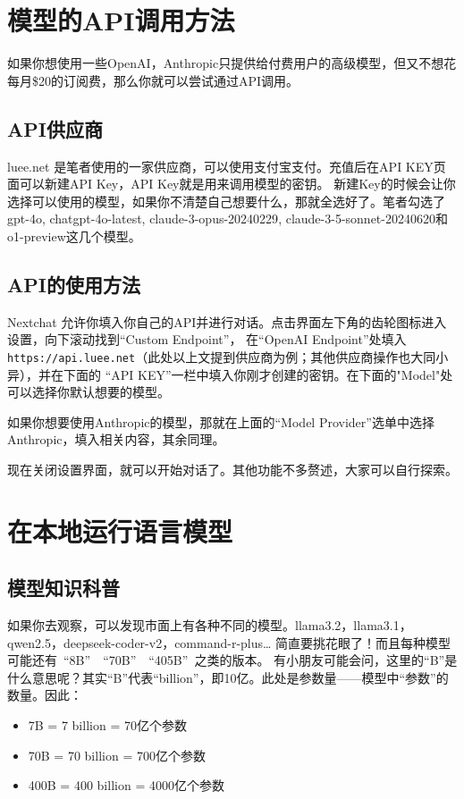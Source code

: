 \hypertarget{api}{\section{模型的API调用方法}}
如果你想使用一些\textsf{OpenAI}，\textsf{Anthropic}只提供给付费用户的高级模型，但又不想花每月\$20的订阅费，那么你就可以尝试通过API调用。

\subsection{API供应商}

\textsf{luee.net} \href{https://luee.net}{\color{black}\faLink} 是笔者使用的一家供应商，可以使用支付宝支付。充值后在API KEY页面可以新建API Key，API Key就是用来调用模型的密钥。
新建Key的时候会让你选择可以使用的模型，如果你不清楚自己想要什么，那就全选好了。笔者勾选了\textsf{gpt-4o}, \textsf{chatgpt-4o-latest}, 
\textsf{claude-3-opus-20240229}, \textsf{claude-3-5-sonnet-20240620}和\textsf{o1-preview}这几个模型。
\subsection{API的使用方法}
\textsf{Nextchat} \href{https://app.nextchat.dev}{\color{black}\faLink} 允许你填入你自己的API并进行对话。点击界面左下角的齿轮图标进入设置，向下滚动找到“Custom Endpoint”，
    在“OpenAI Endpoint”处填入\texttt{https://api.luee.net}（此处以上文提到供应商为例；其他供应商操作也大同小异），并在下面的 “API KEY”一栏中填入你刚才创建的密钥。在下面的"Model"处可以选择你默认想要的模型。

    如果你想要使用\textsf{Anthropic}的模型，那就在上面的“Model Provider”选单中选择\textsf{Anthropic}，填入相关内容，其余同理。

现在关闭设置界面，就可以开始对话了。其他功能不多赘述，大家可以自行探索。

\section{在本地运行语言模型}
\subsection{模型知识科普}
如果你去观察，可以发现市面上有各种不同的模型。\textsf{llama3.2}，\textsf{llama3.1}，\textsf{qwen2.5}，\textsf{deepseek-coder-v2}，\textsf{command-r-plus}\dots
简直要挑花眼了！而且每种模型可能还有\ “8B”\ \ “70B”\ \ “405B”\ 之类的版本。
有小朋友可能会问，这里的“B”是什么意思呢？其实“B”代表“billion”，即10亿。此处是参数量——模型中“参数”的数量。因此：
\begin{itemize}
    \item 7B = 7 billion = 70亿个参数
    \item 70B = 70 billion = 700亿个参数
    \item 400B = 400 billion = 4000亿个参数
\end{itemize}

